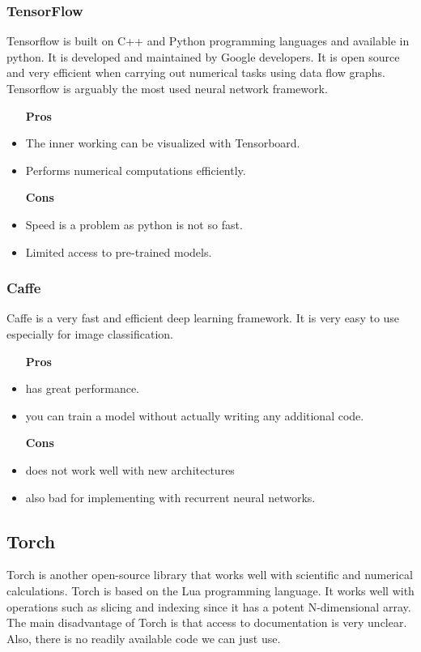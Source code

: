 \documentclass[12pt, a4paper,oneside]{report}
\begin{document}
\subsubsection{TensorFlow}
Tensorflow is built on C++ and Python programming languages and available in python. It is developed and maintained by Google developers.  It is open source and very efficient when carrying out numerical tasks using data flow graphs. Tensorflow is arguably the most used neural network framework.

\begin{itemize}
	\item [\textbf{Pros}]
	\item The inner working can be visualized with Tensorboard.
	\item Performs numerical computations efficiently.
	
	\item [\textbf{Cons}]
	\item Speed is a problem as python is not so fast.
	\item Limited access to pre-trained models.
\end{itemize}

\subsubsection{Caffe}
Caffe is a very fast and efficient deep learning framework. It is very easy to use especially for image classification.

\begin{itemize}
	\item [\textbf{Pros}]
	\item has great performance.
	\item you can train a model without actually writing any additional code.
	
	\item [\textbf{Cons}]
	\item does not work well with new architectures
	\item also bad for implementing with recurrent neural networks.
\end{itemize}

\subsection{Torch}
Torch is another open-source library that works well with scientific and numerical calculations. Torch is based on the Lua programming language. It works well with operations such as slicing and indexing since it has a potent N-dimensional array. The main disadvantage of Torch is that access to documentation is very unclear. Also, there is no readily available code we can just use.
\end{document}
